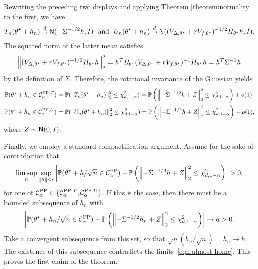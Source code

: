 Rewriting the preceding two displays and applying Theorem \ref{theorem:normality} to the first,
we have
\begin{equation*}
  T_n(\theta^\star + h_n) \mathop{\stackrel{d}{\rightarrow}} \mathsf{N}(-\Sigma^{-1/2} h, I)
  ~~ \mbox{and} ~~
  U_n(\theta^\star + h_n) \mathop{\stackrel{d}{\rightarrow}} \mathsf{N}((V_{\Delta,\theta^\star} + r V_{f,\theta^\star})^{-1/2} H_{\theta^\star} h, I).
\end{equation*}
The squared norm of the latter mean satisfies
\begin{equation*}
  \left\|{(V_{\Delta,\theta^\star} + r V_{f,\theta^\star})^{-1/2} H_{\theta^\star} h}\right\|_2^2
  = h^T H_{\theta^\star} (V_{\Delta,\theta^\star} + r V_{f,\theta^\star})^{-1}
  H_{\theta^\star} h =
  h^T \Sigma^{-1} h
\end{equation*}
by the definition of $\Sigma$. Therefore, the rotational invariance of the Gaussian yields
\begin{equation}
  \begin{split}
    \mathbb{P}(\theta^\star + h_n \in \mathcal{C}_\alpha^{\mathrm{PP},T})
    & = \mathbb{P}(\left\|{T_n(\theta^\star + h_n)}\right\|_2^2
    \le \chi^2_{d,1-\alpha})
    = \mathbb{P}\left(\left\|{-\Sigma^{-1/2} h + Z}\right\|_2^2 \le
    \chi^2_{d,1-\alpha}\right) + o(1) \\
    \mathbb{P}(\theta^\star + h_n \in \mathcal{C}_\alpha^{\mathrm{PP},U})
    & = \mathbb{P}(\left\|{U_n(\theta^\star + h_n)}\right\|_2^2
    \le \chi^2_{d,1-\alpha})
    = \mathbb{P}\left(\left\|{-\Sigma^{-1/2} h + Z}\right\|_2^2 \le
    \chi^2_{d,1-\alpha}\right) + o(1),
  \end{split}
  \label{eqn:almost-home}
\end{equation}
where $Z \sim \mathsf{N}(0, I)$.

Finally, we employ a standard compactification argument. Assume for the sake
of contradiction that
\begin{equation*}
  \limsup_n \sup_{\left\|{h}\right\| \le c}
  \left|\mathbb{P}(\theta^\star + h / \sqrt{n} \in \mathcal{C}^{\mathrm{PP}}_\alpha)
  - \mathbb{P}\left(\left\|{-\Sigma^{-1/2} h + Z}\right\|_2^2 \le \chi^2_{d,1-\alpha}\right)
  \right| > 0,
\end{equation*}
for one of $\mathcal{C}^{\mathrm{PP}}_\alpha \in \{\mathcal{C}_\alpha^{\mathrm{PP},T}, \mathcal{C}_\alpha^{\mathrm{PP},U}\}$.
If this is the case, then there must be a bounded subsequence of $h_n$
with
\begin{equation*}
  \left|\mathbb{P}(\theta^\star + h_n / \sqrt{n} \in \mathcal{C}^{\mathrm{PP}}_\alpha)
  - \mathbb{P}\left(\left\|{-\Sigma^{-1/2} h_n + Z}\right\|_2^2 \le \chi^2_{d,1-\alpha}\right)
  \right| \to a > 0.
\end{equation*}
Take a convergent subsequence from this set, so that $\sqrt{n} (h_n / \sqrt{n})
= h_n \to h$. The existence of this subsequence contradicts
the limits~\eqref{eqn:almost-home}. This proves the first claim of the theorem.


